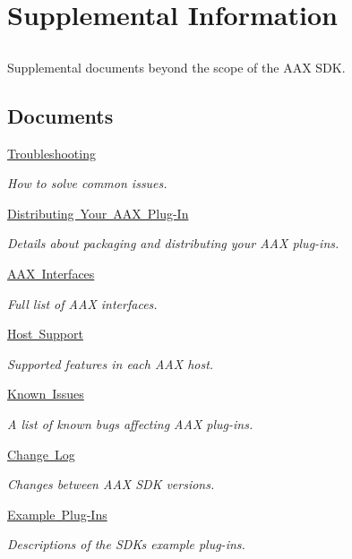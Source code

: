 \hypertarget{a00841}{}\section{Supplemental Information}
\label{a00841}


\subsection{ }
Supplemental documents beyond the scope of the A\+AX S\+DK. 

\subsection*{Documents}
\begin{DoxyCompactItemize}
\item 
\mbox{\hyperlink{a00842}{Troubleshooting}}
\begin{DoxyCompactList}\small\item\em How to solve common issues. \end{DoxyCompactList}\item 
\mbox{\hyperlink{a00843}{Distributing Your A\+A\+X Plug-\/\+In}}
\begin{DoxyCompactList}\small\item\em Details about packaging and distributing your A\+AX plug-\/ins. \end{DoxyCompactList}\item 
\mbox{\hyperlink{a00844}{A\+A\+X Interfaces}}
\begin{DoxyCompactList}\small\item\em Full list of A\+AX interfaces. \end{DoxyCompactList}\item 
\mbox{\hyperlink{a00845}{Host Support}}
\begin{DoxyCompactList}\small\item\em Supported features in each A\+AX host. \end{DoxyCompactList}\item 
\mbox{\hyperlink{a00846}{Known Issues}}
\begin{DoxyCompactList}\small\item\em A list of known bugs affecting A\+AX plug-\/ins. \end{DoxyCompactList}\item 
\mbox{\hyperlink{a00847}{Change Log}}
\begin{DoxyCompactList}\small\item\em Changes between A\+AX S\+DK versions. \end{DoxyCompactList}\item 
\mbox{\hyperlink{a00848}{Example Plug-\/\+Ins}}
\begin{DoxyCompactList}\small\item\em Descriptions of the S\+DK\textquotesingle{}s example plug-\/ins. \end{DoxyCompactList}\end{DoxyCompactItemize}
